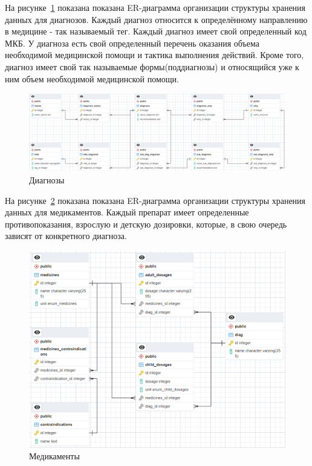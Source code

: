 На рисунке~\ref{fig:fig06} показана показана ER-диаграмма организации структуры хранения данных для диагнозов. Каждый диагноз относится к определённому направлению в медицине - так называемый тег. Каждый диагноз имеет свой определенный код МКБ. У диагноза есть свой определенный перечень оказания объема необходимой медицинской помощи и тактика выполнения действий. Кроме того, диагноз имеет свой так называемые формы(поддиагнозы) и относящийся уже к ним объем необходимой медицинской помощи.

\begin{figure}
  \includegraphics[scale=0.354]{inc/diagnosis}
  \caption{Диагнозы}
  \label{fig:fig06}
\end{figure}

На рисунке~\ref{fig:fig07} показана показана ER-диаграмма организации структуры хранения данных для медикаментов. Каждый препарат имеет определенные противопоказания, взрослую и детскую дозировки, которые, в свою очередь зависят от конкретного диагноза. 

\begin{figure}
  \includegraphics[scale=0.615]{inc/medicines}
  \caption{Медикаменты}
  \label{fig:fig07}
\end{figure}

